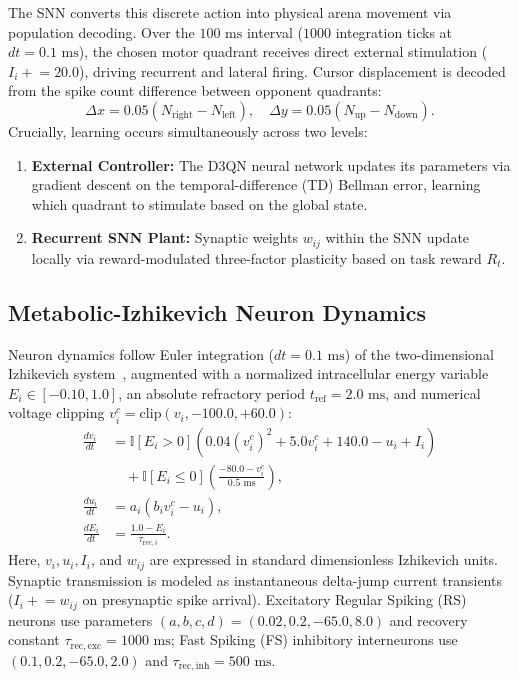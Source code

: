 \documentclass[journal]{IEEEtran}
\begin{document}
The SNN converts this discrete action into physical arena movement via population decoding. Over the $100\text{ ms}$ interval ($1000$ integration ticks at $dt = 0.1\text{ ms}$), the chosen motor quadrant receives direct external stimulation ($I_i \mathrel{+}= 20.0$), driving recurrent and lateral firing. Cursor displacement is decoded from the spike count difference between opponent quadrants:
\begin{equation}
\Delta x = 0.05 \left(N_{\mathrm{right}} - N_{\mathrm{left}}\right), \quad \Delta y = 0.05 \left(N_{\mathrm{up}} - N_{\mathrm{down}}\right).
\label{eq:motor_displacement}
\end{equation}
Crucially, learning occurs simultaneously across two levels:
\begin{enumerate}
    \item \textbf{External Controller:} The D3QN neural network updates its parameters via gradient descent on the temporal-difference (TD) Bellman error, learning which quadrant to stimulate based on the global state.
    \item \textbf{Recurrent SNN Plant:} Synaptic weights $w_{ij}$ within the SNN update locally via reward-modulated three-factor plasticity based on task reward $R_t$.
\end{enumerate}

\subsection{Metabolic-Izhikevich Neuron Dynamics}
Neuron dynamics follow Euler integration ($dt = 0.1\text{ ms}$) of the two-dimensional Izhikevich system~\cite{Izhikevich2003simple}, augmented with a normalized intracellular energy variable $E_i \in [-0.10, 1.0]$, an absolute refractory period $t_{\mathrm{ref}} = 2.0\text{ ms}$, and numerical voltage clipping $v_i^c = \mathrm{clip}(v_i, -100.0, +60.0)$:
\begin{align}
\frac{dv_i}{dt} &= \mathbb{I}[E_i > 0]\left(0.04 (v_i^c)^2 + 5.0 v_i^c + 140.0 - u_i + I_i\right) \nonumber \\
                &\quad + \mathbb{I}[E_i \le 0]\left(\frac{-80.0 - v_i^c}{0.5\text{ ms}}\right), \label{eq:dv} \\
\frac{du_i}{dt} &= a_i\left(b_i v_i^c - u_i\right), \label{eq:du} \\
\frac{dE_i}{dt} &= \frac{1.0 - E_i}{\tau_{\mathrm{rec}, i}}. \label{eq:dE}
\end{align}
Here, $v_i, u_i, I_i$, and $w_{ij}$ are expressed in standard dimensionless Izhikevich units. Synaptic transmission is modeled as instantaneous delta-jump current transients ($I_i \mathrel{+}= w_{ij}$ on presynaptic spike arrival). Excitatory Regular Spiking (RS) neurons use parameters $(a, b, c, d) = (0.02, 0.2, -65.0, 8.0)$ and recovery constant $\tau_{\mathrm{rec,exc}} = 1000\text{ ms}$; Fast Spiking (FS) inhibitory interneurons use $(0.1, 0.2, -65.0, 2.0)$ and $\tau_{\mathrm{rec,inh}} = 500\text{ ms}$.
\end{document}

